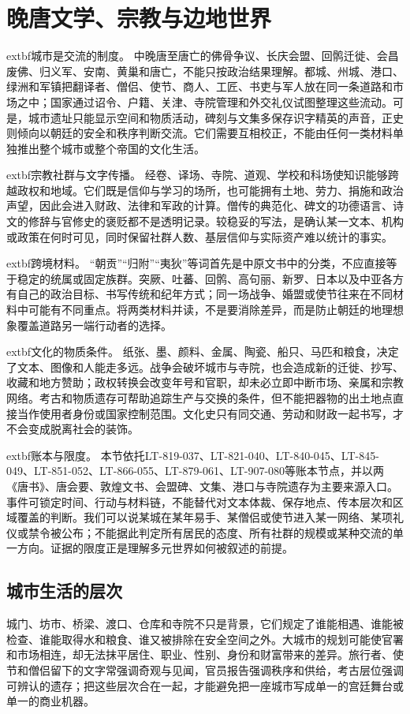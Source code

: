 \section{晚唐文学、宗教与边地世界}
\label{sec:late-tang-literary-borderworlds}

\noindent	extbf{城市是交流的制度。} 中晚唐至唐亡的佛骨争议、长庆会盟、回鹘迁徙、会昌废佛、归义军、安南、黄巢和唐亡，不能只按政治结果理解。都城、州城、港口、绿洲和军镇把翻译者、僧侣、使节、商人、工匠、书吏与军人放在同一条道路和市场之中；国家通过诏令、户籍、关津、寺院管理和外交礼仪试图整理这些流动。可是，城市遗址只能显示空间和物质活动，碑刻与文集多保存识字精英的声音，正史则倾向以朝廷的安全和秩序判断交流。它们需要互相校正，不能由任何一类材料单独推出整个城市或整个帝国的文化生活。

\noindent	extbf{宗教社群与文字传播。} 经卷、译场、寺院、道观、学校和科场使知识能够跨越政权和地域。它们既是信仰与学习的场所，也可能拥有土地、劳力、捐施和政治声望，因此会进入财政、法律和军政的计算。僧传的典范化、碑文的功德语言、诗文的修辞与官修史的褒贬都不是透明记录。较稳妥的写法，是确认某一文本、机构或政策在何时可见，同时保留社群人数、基层信仰与实际资产难以统计的事实。

\noindent	extbf{跨境材料。} “朝贡”“归附”“夷狄”等词首先是中原文书中的分类，不应直接等于稳定的统属或固定族群。突厥、吐蕃、回鹘、高句丽、新罗、日本以及中亚各方有自己的政治目标、书写传统和纪年方式；同一场战争、婚盟或使节往来在不同材料中可能有不同重点。将两类材料并读，不是要消除差异，而是防止朝廷的地理想象覆盖道路另一端行动者的选择。

\noindent	extbf{文化的物质条件。} 纸张、墨、颜料、金属、陶瓷、船只、马匹和粮食，决定了文本、图像和人能走多远。战争会破坏城市与寺院，也会造成新的迁徙、抄写、收藏和地方赞助；政权转换会改变年号和官职，却未必立即中断市场、亲属和宗教网络。考古和物质遗存可帮助追踪生产与交换的条件，但不能把器物的出土地点直接当作使用者身份或国家控制范围。文化史只有同交通、劳动和财政一起书写，才不会变成脱离社会的装饰。

\noindent	extbf{账本与限度。} 本节依托LT-819-037、LT-821-040、LT-840-045、LT-845-049、LT-851-052、LT-866-055、LT-879-061、LT-907-080等账本节点，并以两《唐书》、唐会要、敦煌文书、会盟碑、文集、港口与寺院遗存为主要来源入口。事件可锁定时间、行动与材料链，不能替代对文本体裁、保存地点、传本层次和区域覆盖的判断。我们可以说某城在某年易手、某僧侣或使节进入某一网络、某项礼仪或禁令被公布；不能据此判定所有居民的态度、所有社群的规模或某种交流的单一方向。证据的限度正是理解多元世界如何被叙述的前提。

\subsection{城市生活的层次}
城门、坊市、桥梁、渡口、仓库和寺院不只是背景，它们规定了谁能相遇、谁能被检查、谁能取得水和粮食、谁又被排除在安全空间之外。大城市的规划可能使官署和市场相连，却无法抹平居住、职业、性别、身份和财富带来的差异。旅行者、使节和僧侣留下的文字常强调奇观与见闻，官员报告强调秩序和供给，考古层位强调可辨认的遗存；把这些层次合在一起，才能避免把一座城市写成单一的宫廷舞台或单一的商业机器。

